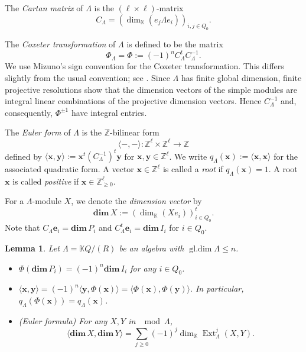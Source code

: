\documentclass[11pt,a4paper]{amsart}
\newtheorem{lemma}[theorem]{Lemma}
\theoremstyle{definition}
\numberwithin{equation}{section}
\newcommand{\y}{\mathbf{y}}
\newcommand{\x}{\mathbf{x}}
\newcommand{\0}{\mathbf{0}}
\newcommand{\dimv}{\mathbf{dim}\,}
\newcommand{\Ext}{\operatorname{Ext}\nolimits}
\begin{document}
	 The \emph{Cartan matrix} of $\Lambda$ is the $(\ell\times \ell)$-matrix
	$$C_\Lambda =  (\dim_{\mathbb{K}}(e_j\Lambda e_i))_{i,j\in Q_0}.$$
		
	The \emph{Coxeter transformation} of $\Lambda$ is defined to be the matrix
	$$\Phi_\Lambda=\Phi := (-1)^nC_\Lambda^t C_\Lambda^{-1}.$$
	We  use Mizuno's sign convention \cite[Definition~2.1]{Miz}
	for the Coxeter transformation.
	This differs slightly from the usual convention; see \cite[III, Definition~3.14]{ASS}.  Since $\Lambda$ has finite global dimension, finite projective resolutions
	show that the dimension vectors of the simple modules are integral linear
	combinations of the projective dimension vectors. Hence $C_\Lambda^{-1}$
	and, consequently, $\Phi^{\pm1}$ have integral entries.
	
	The \emph{Euler form} of $\Lambda$ is the $\mathbb{Z}$-bilinear form
	$$\langle -, - \rangle : \mathbb{Z}^\ell \times \mathbb{Z}^\ell  \to \mathbb{Z}$$
	defined by $\langle \x,\y\rangle:= \x^t(C_\Lambda^{-1})^t  \y$
	for $\x ,\y  \in \mathbb{Z}^\ell $.
	We write $q_\Lambda(\x):=\langle\x,\x\rangle$ for the associated
	quadratic form. A vector $\x\in\mathbb{Z}^{\ell}$ is called
	a \emph{root} if $q_\Lambda(\x)=1$. A root $\x$ is called \emph{positive} if
	$\x\in\mathbb Z_{\geq0}^{\ell}$. 
	
	 For a $\Lambda$-module $X$, we denote the \emph{dimension vector} by 
	$${\dimv} X :=(\dim_{\mathbb{K}} (Xe_i))_{i\in Q_0}^t.$$
	Note that $C_\Lambda\mathbf e_i=\dimv P_i$ and
	$C_\Lambda^t\mathbf e_i=\dimv I_i$ for $i\in Q_0$.


	\begin{lemma}\cite[Lemma 2.2]{Miz} \label{Euler form}
	Let $\Lambda=\mathbb{K}Q/(R)$ be an algebra with $\operatorname{gl.dim}\Lambda\le n$.
	\begin{itemize}
		\item[(a)]  $\Phi(\dimv P_i)=(-1)^{n}\dimv I_i$ for any $i\in Q_0$.
		\item[(b)] $\langle \x,\y\rangle=(-1)^{n}\langle \y,\Phi(\x)\rangle=\langle \Phi(\x),\Phi(\y)\rangle.$ In particular,   $q_\Lambda(\Phi(\x))=q_\Lambda(\x)$.
		\item[(c)] (Euler formula) For any $X,Y$ in $\mod\Lambda$, 
		$$ \langle {\dimv}X, {\dimv }Y\rangle  = \sum_{j \geq 0}(-1)^j\dim_{\mathbb{K}}\Ext^j_\Lambda(X,Y).$$
	\end{itemize}
	\end{lemma}
	
\end{document}
